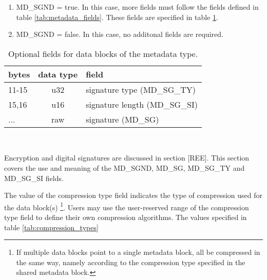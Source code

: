 \documentclass[pagesize=a4]{tufte-book}
\begin{document}
\begin{enumerate}
	\item MD\_SGND = true. In this case, more fields must follow the fields defined in table \ref{tab:metadata_fields}. These fields are specified in table \ref{tab:metadata_optional_fields}.
	\item MD\_SGND = false. In this case, no additonal fields are required.
\end{enumerate}

\begin{table}[ht]
	\centering
	\selectfont
	\begin{tabular}{lcl}
		\toprule
		bytes & data type & field\\
		\midrule
		11-15 & u32 & signature type (MD\_SG\_TY)\\
		15,16 & u16 & signature length (MD\_SG\_SI)\\
		... & raw & signature (MD\_SG)\\
		\bottomrule
	\end{tabular}
	~\label{tab:metadata_optional_fields}
	\caption{Optional fields for data blocks of the metadata type.}	
\end{table}

Encryption and digital signatures are discussed in section [REE]. This section covers the use and meaning of the MD\_SGND, MD\_SG, MD\_SG\_TY and MD\_SG\_SI fields.

The value of the compression type field indicates the type of compression used for the data block(s) \footnote{If multiple data blocks point to a single metadata block, all  be compressed in the same way, namely according to the compression type specified in the shared metadata block.}. Users may use the user-reserved range of the compression type field to define their own compression algorithms. The values specified in table \ref{tab:compression_types}
\end{document}
